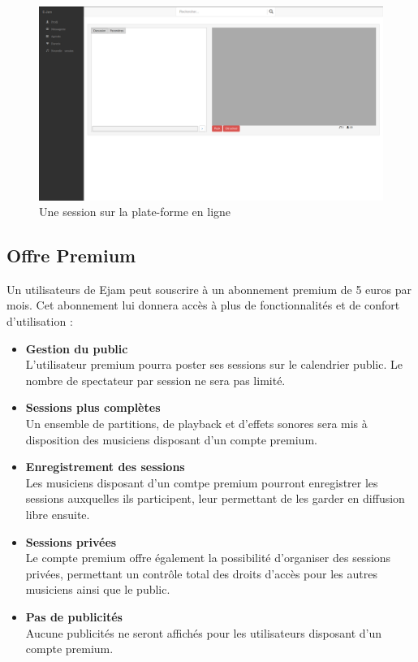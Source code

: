 \documentclass[a4,12pt]{article}
\begin{document}
\begin{figure}[!ht]
    \center
    \includegraphics[width=15cm]{ceca_site_session.png}
    \caption{Une session sur la plate-forme en ligne}
    \label{ceca_site_session}
\end{figure}

\subsection{Offre Premium}

Un utilisateurs de Ejam peut souscrire à un abonnement premium de 5 euros par mois. Cet abonnement lui donnera
accès à plus de fonctionnalités et de confort d'utilisation :

\begin{itemize}
    \item \textbf{Gestion du public}\\
		L'utilisateur premium pourra poster ses sessions sur le calendrier public. Le nombre de spectateur par session ne sera pas limité.
    \item \textbf{Sessions plus complètes}\\
		Un ensemble de partitions, de playback et d'effets sonores sera mis à disposition des musiciens disposant d'un compte premium.
    \item \textbf{Enregistrement des sessions}\\
        Les musiciens disposant d'un comtpe premium pourront enregistrer les sessions auxquelles ils participent, leur permettant de les garder en diffusion libre ensuite.
    \item \textbf{Sessions privées}\\
        Le compte premium offre également la possibilité d'organiser des sessions privées, permettant un contrôle total des droits d'accès pour les autres musiciens ainsi que le public.
    \item \textbf{Pas de publicités}\\
        Aucune publicités ne seront affichés pour les utilisateurs disposant d'un compte premium.
\end{itemize}
\end{document}
